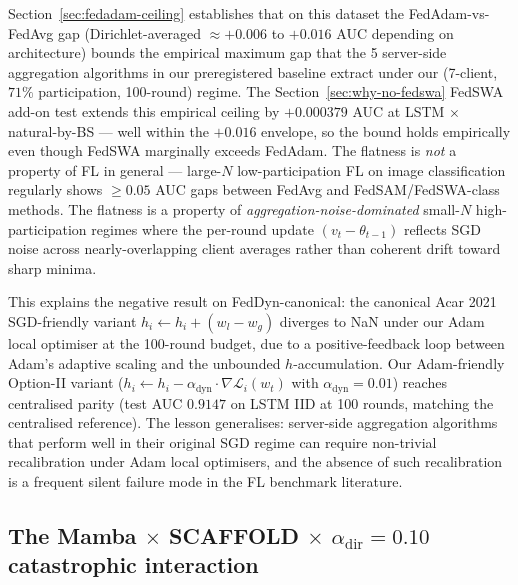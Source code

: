 \documentclass[journal]{IEEEtran}
\newcommand{\alphadir}{\ensuremath{\alpha_{\mathrm{dir}}}}
\newcommand{\alphadyn}{\ensuremath{\alpha_{\mathrm{dyn}}}}
\begin{document}
Section~\ref{sec:fedadam-ceiling} establishes that on this dataset the FedAdam-vs-FedAvg gap (Dirichlet-averaged $\approx +0.006$ to $+0.016$ AUC depending on architecture) bounds the empirical maximum gap that the 5 server-side aggregation algorithms in our preregistered baseline extract under our (7-client, $71\%$ participation, 100-round) regime. The Section~\ref{sec:why-no-fedswa} FedSWA add-on test extends this empirical ceiling by $+0.000379$ AUC at LSTM $\times$ natural-by-BS --- well within the $+0.016$ envelope, so the bound holds empirically even though FedSWA marginally exceeds FedAdam. The flatness is \emph{not} a property of FL in general --- large-$N$ low-participation FL on image classification regularly shows $\geq 0.05$ AUC gaps between FedAvg and FedSAM/FedSWA-class methods. The flatness is a property of \emph{aggregation-noise-dominated} small-$N$ high-participation regimes where the per-round update $(v_t - \theta_{t-1})$ reflects SGD noise across nearly-overlapping client averages rather than coherent drift toward sharp minima.

This explains the negative result on FedDyn-canonical: the canonical Acar 2021 SGD-friendly variant $h_i \leftarrow h_i + (w_l - w_g)$ diverges to NaN under our Adam local optimiser at the 100-round budget, due to a positive-feedback loop between Adam's adaptive scaling and the unbounded $h$-accumulation. Our Adam-friendly Option-II variant ($h_i \leftarrow h_i - \alphadyn \cdot \nabla \mathcal{L}_i(w_t)$ with $\alphadyn = 0.01$) reaches centralised parity (test AUC $0.9147$ on LSTM IID at 100 rounds, matching the centralised reference). The lesson generalises: server-side aggregation algorithms that perform well in their original SGD regime can require non-trivial recalibration under Adam local optimisers, and the absence of such recalibration is a frequent silent failure mode in the FL benchmark literature.

\subsection{The Mamba $\times$ SCAFFOLD $\times$ $\alphadir = 0.10$ catastrophic interaction}
\end{document}
